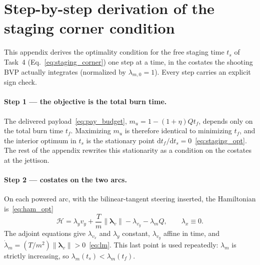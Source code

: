 \documentclass[../main.tex]{subfiles}
\begin{document}
\section{Step-by-step derivation of the staging corner condition}\label{sec:appendix_staging}

This appendix derives the optimality condition for the free staging time $t_s$ of Task~4 (Eq.~\eqref{eq:staging_corner}) one step at a time, in the costates the shooting BVP actually integrates (normalized by $\lambda_{m,0}=1$). Every step carries an explicit sign check.

\paragraph{Step 1 --- the objective is the total burn time.}
The delivered payload~\eqref{eq:pay_budget}, $m_u = 1-(1+\eta)Q t_f$, depends only on the total burn time $t_f$. Maximizing $m_u$ is therefore identical to minimizing $t_f$, and the interior optimum in $t_s$ is the stationary point $\mathrm{d}t_f/\mathrm{d}t_s = 0$~\eqref{eq:staging_opt}. The rest of the appendix rewrites this stationarity as a condition on the costates at the jettison.

\paragraph{Step 2 --- costates on the two arcs.}
On each powered arc, with the bilinear-tangent steering inserted, the Hamiltonian is~\eqref{eq:ham_opt}
\begin{equation}
  \mathcal{H} = \lambda_y v_y + \frac{T}{m}\|\boldsymbol{\lambda}_v\| - \lambda_{v_y} - \lambda_m Q,
  \qquad \lambda_x \equiv 0 .
\end{equation}
The adjoint equations give $\lambda_{v_x}$ and $\lambda_y$ constant, $\lambda_{v_y}$ affine in time, and $\dot\lambda_m = (T/m^2)\|\boldsymbol{\lambda}_v\| > 0$~\eqref{eq:lm}. This last point is used repeatedly: $\lambda_m$ is strictly increasing, so $\lambda_m(t_s) < \lambda_m(t_f)$.
\end{document}
